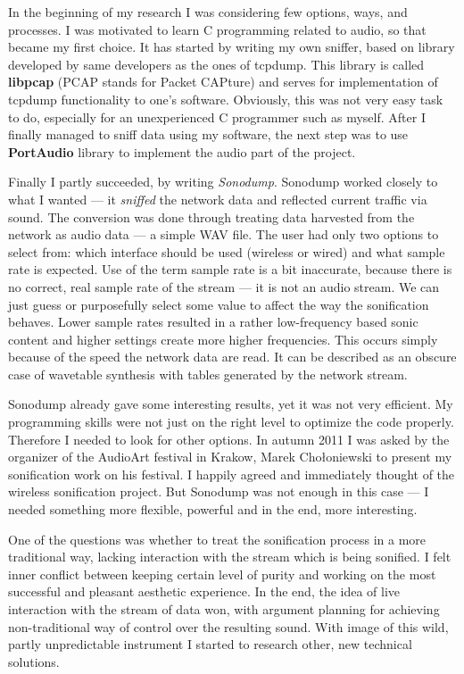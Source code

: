 \documentclass[12pt,a4paper,oneside]{report}
\begin{document}
In the beginning of my research I was considering few options, ways, and processes. I was motivated to learn C programming related to audio, so that became my first choice. It has started by writing my own sniffer, based on library developed by same developers as the ones of tcpdump. This library is called \textbf{libpcap} (PCAP stands for Packet CAPture) and serves for implementation of tcpdump functionality to one's software. Obviously, this was not very easy task to do, especially for an unexperienced C programmer such as myself. After I finally managed to sniff data using my software, the next step was to use \textbf{PortAudio} library to implement the audio part of the project.

Finally I partly succeeded, by writing \emph{Sonodump}. Sonodump worked closely to what I wanted --- it \emph{sniffed} the network data and reflected current traffic via sound. The conversion was done through treating data harvested from the network as audio data --- a simple WAV file. The user had only two options to select from: which interface should be used (wireless or wired) and what sample rate is expected. Use of the term sample rate is a bit inaccurate, because there is no correct, real sample rate of the stream --- it is not an audio stream. We can just guess or purposefully select some value to affect the way the sonification behaves. Lower sample rates resulted in a rather low-frequency based sonic content and higher settings create more higher frequencies. This occurs simply because of the speed the network data are read. It can be described as an obscure case of wavetable synthesis with tables generated by the network stream.

Sonodump already gave some interesting results, yet it was not very efficient. My programming skills were not just on the right level to optimize the code properly. Therefore I needed to look for other options. In autumn 2011 I was asked by the organizer of the AudioArt festival in Krakow, Marek Chołoniewski to present my sonification work on his festival. I happily agreed and immediately thought of the wireless sonification project. But Sonodump was not enough in this case --- I needed something more flexible, powerful and in the end, more interesting.

One of the questions was whether to treat the sonification process in a more traditional way, lacking interaction with the stream which is being sonified. I felt inner conflict between keeping certain level of purity and working on the most successful and pleasant aesthetic experience. In the end, the idea of live interaction with the stream of data won, with argument planning for achieving non-traditional way of control over the resulting sound. With image of this wild, partly unpredictable instrument I started to research other, new technical solutions.
\end{document}
